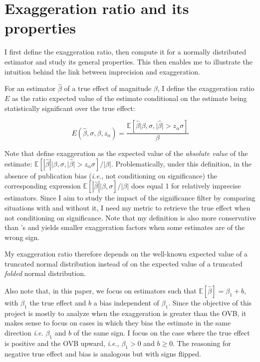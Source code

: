 \documentclass[a4paper, 11pt]{report}
\begin{document}

	\section{Exaggeration ratio and its properties}\label{general_exagg}
	
		 I first define the exaggeration ratio, then compute it for a normally distributed estimator and study its general properties. This then enables me to illustrate the intuition behind the link between imprecision and exaggeration.
		 
		 	\begin{definition}
		 		For an estimator $\hat{\beta}$ of a true effect of magnitude $\beta$, I define the exaggeration ratio $E$ as the ratio expected value of the estimate conditional on the estimate being statistically significant over the true effect:
		 
				 \begin{equation}\label{exagg_general}
				 	E(\hat{\beta}, \sigma, \beta, z_{\alpha}) = \dfrac{\mathbb{E}\left[ \hat{\beta} | \beta, \sigma, | \hat{\beta} | > z_{\alpha} \sigma \right]}{\beta} 
				\end{equation}
			\end{definition}
		
			Note that \cite{gelman_beyond_2014} define exaggeration as the expected value of the \textit{absolute value} of the estimate: $\mathbb{E}\left[ | \hat{\beta}| | \beta, \sigma, | \hat{\beta} | > z_{\alpha} \sigma \right] / | \beta |$. Problematically, under this definition, in the absence of publication bias (\textit{i.e.}, not conditioning on significance) the corresponding expression $\mathbb{E}\left[ | \hat{\beta}| | \beta, \sigma \right] / | \beta |$ does equal 1 for relatively imprecise estimators. Since I aim to study the impact of the significance filter by comparing situations with and without it, I need my metric to retrieve the true effect when not conditioning on significance. Note that my definition is also more conservative than \citeauthor{gelman_beyond_2014}'s and yields smaller exaggeration factors when some estimates are of the wrong sign.
			
			My exaggeration ratio therefore depends on the well-known expected value of a truncated normal distribution instead of on the expected value of a truncated \textit{folded} normal distribution. 
			
			Also note that, in this paper, we focus on estimators such that $\mathbb{E}[\hat{\beta}] = \beta_{1} + b$, with $\beta_{1}$ the true effect and $b$ a bias independent of $\beta_{1}$. Since the objective of this project is mostly to analyze when the exaggeration is greater than the OVB, it makes sense to focus on cases in which they bias the estimate in the same direction \textit{i.e.} $\beta_{1}$ and $b$ of the same sign. I focus on the case where the true effect is positive and the OVB upward, \textit{i.e.}, $\beta_{1} > 0$ and $b \geq 0$. The reasoning for negative true effect and bias is analogous but with signs flipped. 
\end{document}
